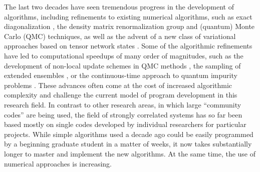 \documentclass[12pt]{iopart}
\begin{document}
The last two decades have seen tremendous progress in the development of
algorithms, including refinements to existing numerical algorithms, such as exact diagonalization \cite{lanczos},
the density matrix renormalization group \cite{White1992,Schollwock2005,Daley2004,White2004} and (quantum) 
Monte Carlo (QMC) techniques, as well as the  advent of a new class of variational approaches based on 
tensor network states \cite{vidal1,vidal2,Verstraete04,Murg07,vidal07}. 
Some of the algorithmic refinements have led to computational speedups of many order of magnitudes, such as 
the development of non-local update schemes \cite{Swendsen87} in QMC methods \cite{Prokofev98A,Todo01,looper,Sylyuasen,Alet2005}, 
the sampling of extended ensembles \cite{Wang01,Wang01b,Troyer03,Trebst04,Katzgraber06,Wessel07},
or the continuous-time approach to quantum impurity problems \cite{Evertz03,Rubtsov04,Rubtsov05,Werner06,Werner06Kondo, Gull08_ctaux}.
These advances often come at the cost of increased algorithmic
complexity and challenge the current model of program development in
this research field. In contrast to other research areas, in which
large ``community codes'' are being used, the field of strongly
correlated systems has so far been based mostly on single codes developed by
individual researchers for particular projects. While simple
algorithms used a decade ago could be easily programmed by a beginning
graduate student in a matter of weeks, it now takes substantially
longer to master and implement the new algorithms.  At the same time, the use of numerical approaches is increasing.  
\end{document}
